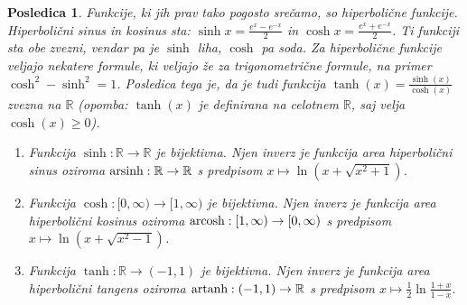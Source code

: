 \documentclass[10pt, a4paper]{article}
\newtheorem{posledica}[izr]{Posledica}
\newcommand{\R}{\mathbb {R}}
\begin{document}
\begin{posledica}
    Funkcije, ki jih prav tako pogosto srečamo, so hiperbolične funkcije. Hiperbolični sinus in kosinus sta:
            $\sinh x = \frac{e^x-e^{-x}}{2}$ in $\cosh x = \frac{e^x + e^{-x}}{2}$.
        Ti funkciji sta obe zvezni, vendar pa je $\sinh$ liha, $\cosh$ pa soda. Za hiperbolične funkcije veljajo nekatere formule, ki veljajo že za trigonometrične formule, na primer
        $\cosh^2 - \sinh^2 = 1$.
        Posledica tega je, da je tudi funkcija
        $\tanh(x) = \frac{\sinh(x)}{\cosh(x)}$ zvezna na $\R$ (opomba: $\tanh(x)$ je definirana na celotnem $\R$, saj velja $\cosh(x) \geq 0$).
        \begin{enumerate}
            \item Funkcija $\sinh : \R \rightarrow \R$ je bijektivna. Njen inverz je funkcija area hiperbolični sinus oziroma $\textup{\text{arsinh}} : \R \rightarrow \R$ s predpisom
            $x \mapsto \ln{(x + \sqrt{x^2 + 1})}$.

            \item Funkcija $\cosh : [0, \infty) \rightarrow [1, \infty)$ je bijektivna. Njen inverz je funkcija area hiperbolični kosinus oziroma $\textup{\text{arcosh}} : [1, \infty) \rightarrow [0, \infty)$ s predpisom
            $x \mapsto \ln{(x + \sqrt{x^2 - 1})}$.

            \item Funkcija $\tanh : \R \rightarrow (-1, 1)$ je bijektivna. Njen inverz je funkcija area hiperbolični tangens oziroma $\textup{\text{artanh}} : (-1, 1) \rightarrow \R$ s predpisom
            $x \mapsto \frac{1}{2} \ln{\frac{1+x}{1-x}}$.
        \end{enumerate}
\end{posledica}
\end{document}
